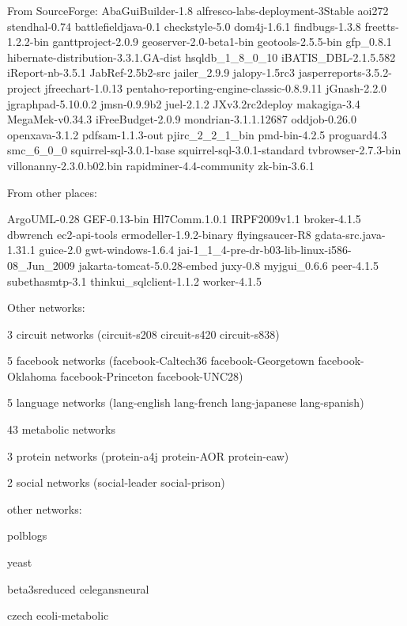 From SourceForge:
AbaGuiBuilder-1.8
alfresco-labs-deployment-3Stable
aoi272
stendhal-0.74
battlefieldjava-0.1
checkstyle-5.0
dom4j-1.6.1
findbugs-1.3.8
freetts-1.2.2-bin
ganttproject-2.0.9
geoserver-2.0-beta1-bin
geotools-2.5.5-bin
gfp\_0.8.1
hibernate-distribution-3.3.1.GA-dist
hsqldb\_1\_8\_0\_10
iBATIS\_DBL-2.1.5.582
iReport-nb-3.5.1
JabRef-2.5b2-src
jailer\_2.9.9
jalopy-1.5rc3
jasperreports-3.5.2-project
jfreechart-1.0.13
pentaho-reporting-engine-classic-0.8.9.11
jGnash-2.2.0
jgraphpad-5.10.0.2
jmsn-0.9.9b2
juel-2.1.2
JXv3.2rc2deploy
makagiga-3.4
MegaMek-v0.34.3
iFreeBudget-2.0.9
mondrian-3.1.1.12687
oddjob-0.26.0
openxava-3.1.2
pdfsam-1.1.3-out
pjirc\_2\_2\_1\_bin
pmd-bin-4.2.5
proguard4.3
smc\_6\_0\_0
squirrel-sql-3.0.1-base
squirrel-sql-3.0.1-standard
tvbrowser-2.7.3-bin
villonanny-2.3.0.b02.bin
rapidminer-4.4-community
zk-bin-3.6.1

From other places:

ArgoUML-0.28
GEF-0.13-bin
Hl7Comm.1.0.1
IRPF2009v1.1
broker-4.1.5
dbwrench
ec2-api-tools
ermodeller-1.9.2-binary
flyingsaucer-R8
gdata-src.java-1.31.1
guice-2.0
gwt-windows-1.6.4
jai-1\_1\_4-pre-dr-b03-lib-linux-i586-08\_Jun\_2009
jakarta-tomcat-5.0.28-embed
juxy-0.8
myjgui\_0.6.6
peer-4.1.5
subethasmtp-3.1
thinkui\_sqlclient-1.1.2
worker-4.1.5

Other networks:

3 circuit networks (circuit-s208 circuit-s420 circuit-s838)

5 facebook networks (facebook-Caltech36 facebook-Georgetown facebook-Oklahoma
facebook-Princeton facebook-UNC28)

5 language networks (lang-english  lang-french lang-japanese lang-spanish)

43 metabolic networks

3 protein networks (protein-a4j protein-AOR protein-eaw)

2 social networks (social-leader social-prison)

other networks:

polblogs

yeast

beta3sreduced
celegansneural

czech
ecoli-metabolic
